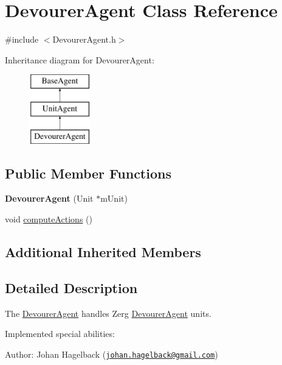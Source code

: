 \hypertarget{class_devourer_agent}{\section{Devourer\-Agent Class Reference}
\label{class_devourer_agent}
}


{\ttfamily \#include $<$Devourer\-Agent.\-h$>$}

Inheritance diagram for Devourer\-Agent\-:\begin{figure}[H]
\begin{center}
\leavevmode
\includegraphics[height=3.000000cm]{class_devourer_agent}
\end{center}
\end{figure}
\subsection*{Public Member Functions}
\begin{DoxyCompactItemize}
\item 
\hypertarget{class_devourer_agent_a0e19ddd852adb37f6010251aa2da76f4}{{\bfseries Devourer\-Agent} (Unit $\ast$m\-Unit)}\label{class_devourer_agent_a0e19ddd852adb37f6010251aa2da76f4}

\item 
void \hyperlink{class_devourer_agent_ad9d9403d0035a4f8737a60573dd8053f}{compute\-Actions} ()
\end{DoxyCompactItemize}
\subsection*{Additional Inherited Members}


\subsection{Detailed Description}
The \hyperlink{class_devourer_agent}{Devourer\-Agent} handles Zerg \hyperlink{class_devourer_agent}{Devourer\-Agent} units.

Implemented special abilities\-:
\begin{DoxyItemize}
\item Author\-: Johan Hagelback (\href{mailto:johan.hagelback@gmail.com}{\tt johan.\-hagelback@gmail.\-com}) 
\end{DoxyItemize}


